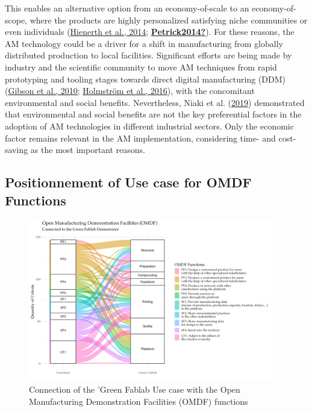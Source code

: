 \documentclass[
  11pt,
]{article}
\begin{document}
This enables an alternative option from an economy-of-scale to an
economy-of-scope, where the products are highly personalized satisfying
niche communities or even individuals
(\protect\hyperlink{ref-Hienerth2014}{Hienerth et al., 2014};
\protect\hyperlink{ref-Petrick2014}{\textbf{Petrick2014?}}). For these
reasons, the AM technology could be a driver for a shift in
manufacturing from globally distributed production to local facilities.
Significant efforts are being made by industry and the scientific
community to move AM techniques from rapid prototyping and tooling
stages towards direct digital manufacturing (DDM)
(\protect\hyperlink{ref-Mueller2012}{Gibson et al., 2010};
\protect\hyperlink{ref-Holmstrom2016}{Holmström et al., 2016}), with the
concomitant environmental and social benefits. Nevertheless, Niaki et
al. (\protect\hyperlink{ref-Niaki2019}{2019}) demonstrated that
environmental and social benefits are not the key preferential factors
in the adoption of AM technologies in different industrial sectors. Only
the economic factor remains relevant in the AM implementation,
considering time- and cost-saving as the most important reasons.

\hypertarget{positionnement-of-use-case-for-omdf-functions}{%
\subsection{Positionnement of Use case for OMDF
Functions}\label{positionnement-of-use-case-for-omdf-functions}}

\begin{figure}

{\centering \includegraphics[width=0.95\textwidth,height=\textheight]{figures/Sankey-GF-Global.jpg}

}

\caption{\label{fig-dram}Connection of the 'Green Fablab Use case with
the Open Manufacturing Demonstration Facilities (OMDF) functions}

\end{figure}
\end{document}
